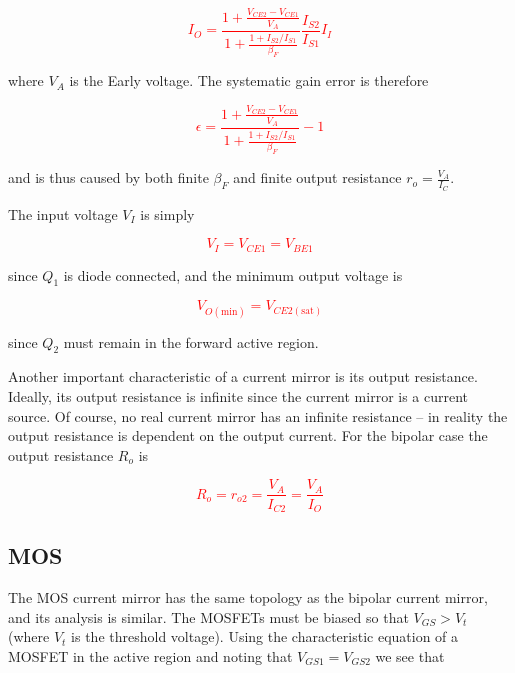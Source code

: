 \textcolor{red}{
\begin{equation}
I_{O} = \frac{1+\frac{V_{CE2}-V_{CE1}}{V_{A}}}{1+\frac{1+I_{S2}/I_{S1}}{\beta_{F}}}\frac{I_{S2}}{I_{S1}}I_{I}
\label{eq:fullsimplecurrentmirror}
\end{equation}
}

where $V_{A}$ is the Early voltage.
The systematic gain error is therefore

\textcolor{red}{
\begin{equation}
\epsilon = \frac{1+\frac{V_{CE2}-V_{CE1}}{V_{A}}}{1+\frac{1+I_{S2}/I_{S1}}{\beta_{F}}}-1
\label{eq:simplecurrentmirror_sysgainerr}
\end{equation}
}

and is thus caused by both finite $\beta_{F}$ and finite output resistance $r_{o} = \frac{V_{A}}{I_{C}}$.

The input voltage $V_{I}$ is simply

\textcolor{red}{
\begin{equation}
V_{I} = V_{CE1} = V_{BE1}
\label{eq:simplecurrentmirror_Vi}
\end{equation}
}

since $Q_1$ is diode connected, and the minimum output voltage is

\textcolor{red}{
\begin{equation}
V_{O(\text{min})} = V_{CE2(\text{sat})}
\label{eq:simplecurrentmirror_Vo}
\end{equation}
}

since $Q_2$ must remain in the forward active region.

Another important characteristic of a current mirror is its output resistance.
Ideally, its output resistance is infinite since the current mirror is a current source.
Of course, no real current mirror has an infinite resistance -- in reality the output resistance is dependent on the output current.
For the bipolar case the output resistance \autocite[255-256]{analysis-design-analog-ics} $R_{o}$ is

\textcolor{red}{
\begin{equation}
R_{o} = r_{o2} = \frac{V_{A}}{I_{C2}} = \frac{V_{A}}{I_{O}}
\label{eq:simplecurrentmirror_Ro}
\end{equation}
}

\subsection{MOS}
The MOS current mirror has the same topology as the bipolar current mirror, and its analysis is similar. The MOSFETs must be biased so that $V_{GS} > V_{t}$ (where $V_{t}$ is the threshold voltage).
Using the characteristic equation of a MOSFET in the active region and noting that $V_{GS1} = V_{GS2}$ we see that

